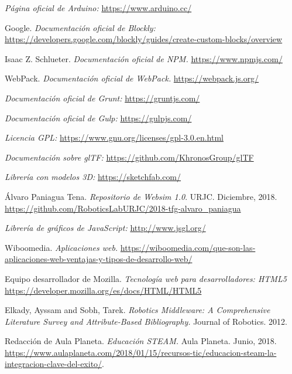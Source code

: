 \begin{thebibliography}{99}
    \textit{Página oficial de Arduino:}
    \url{https://www.arduino.cc/}
    
    Google.
    \textit{Documentación oficial de Blockly:}
    \url{https://developers.google.com/blockly/guides/create-custom-blocks/overview}
    
    Isaac Z. Schlueter.
    \textit{Documentación oficial de NPM.}
    \url{https://www.npmjs.com/}
    
    WebPack. 
    \textit{Documentación oficial de WebPack.}
    \url{https://webpack.js.org/}
    
    \textit{Documentación oficial de Grunt:}
    \url{https://gruntjs.com/}
    
    \textit{Documentación oficial de Gulp:}
    \url{https://gulpjs.com/}
    
    \textit{Licencia GPL:}
    \url{https://www.gnu.org/licenses/gpl-3.0.en.html}
    
    \textit{Documentación sobre glTF:}
    \url{https://github.com/KhronosGroup/glTF}
    
    \textit{Librería con modelos 3D:}
    \url{https://sketchfab.com/}
    
    Álvaro Paniagua Tena.
    \textit{Repositorio de Websim 1.0}. URJC. Diciembre, 2018.
    \url{https://github.com/RoboticsLabURJC/2018-tfg-alvaro_paniagua}
    
    \textit{Librería de gráficos de JavaScript:}
    \url{http://www.jsgl.org/}
    
    Wiboomedia.
    \textit{Aplicaciones web.}
    \url{https://wiboomedia.com/que-son-las-aplicaciones-web-ventajas-y-tipos-de-desarrollo-web/}

    Equipo desarrollador de Mozilla.
    \textit{Tecnología web para desarrolladores: HTML5}   \url{https://developer.mozilla.org/es/docs/HTML/HTML5}
     
    Elkady, Ayssam and Sobh, Tarek. 
    \textit{Robotics Middleware: A Comprehensive Literature Survey and Attribute-Based Bibliography.} Journal of Robotics. 2012.  
    
     Redacción de Aula Planeta.
    \textit{Educación STEAM.} 
    Aula Planeta. Junio, 2018. \url{https://www.aulaplaneta.com/2018/01/15/recursos-tic/educacion-steam-la-integracion-clave-del-exito/}.
    

\end{thebibliography}
